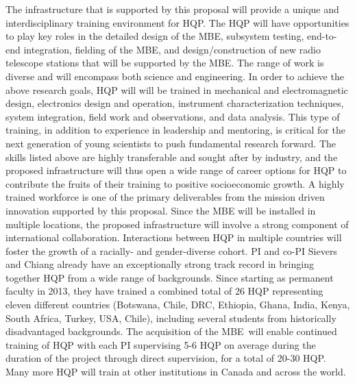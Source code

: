 \documentclass[letterpaper,11pt,preprint]{aastex}
\newcommand{\mbe}{{\rm MBE}}
\begin{document}
The infrastructure that is supported by this proposal will provide a
unique and interdisciplinary training environment for HQP.  The HQP
will have opportunities to play key roles in the detailed design of
the \mbe, subsystem testing, end-to-end integration, fielding of the
\mbe, and design/construction of new radio telescope stations that
will be supported by the \mbe.  The range of work is diverse and will
encompass both science and engineering.  In order to achieve the above
research goals, HQP will will be trained in mechanical and
electromagnetic design, electronics design and operation, instrument
characterization techniques, system integration, field work and
observations, and data analysis.  This type of training, in addition
to experience in leadership and mentoring, is critical for the next
generation of young scientists to push fundamental research forward.
The skills listed above are highly transferable and sought after by
industry, and the proposed infrastructure will thus open a wide range
of career options for HQP to contribute the fruits of their training
to positive socioeconomic growth.  A highly trained workforce is one
of the primary deliverables from the mission driven innovation
supported by this proposal.  Since the MBE will be installed in
multiple locations, the proposed infrastructure will involve a strong
component of international collaboration.  Interactions between HQP in
multiple countries will foster the growth of a racially- and
gender-diverse cohort.  PI and co-PI Sievers and Chiang already have
an exceptionally strong track record in bringing together HQP from a
wide range of backgrounds.  Since starting as permanent faculty in
2013, they have trained a combined total of 26 HQP representing eleven
different countries (Botswana, Chile, DRC, Ethiopia, Ghana, India,
Kenya, South Africa, Turkey, USA, Chile), including several students
from historically disadvantaged backgrounds.  The acquisition of the
\mbe\ will enable continued training of HQP with each PI supervising
5-6 HQP on average during the duration of the project through direct
supervision, for a total of 20-30 HQP.  Many more HQP will train at
other institutions in Canada and across the world.
\end{document}
